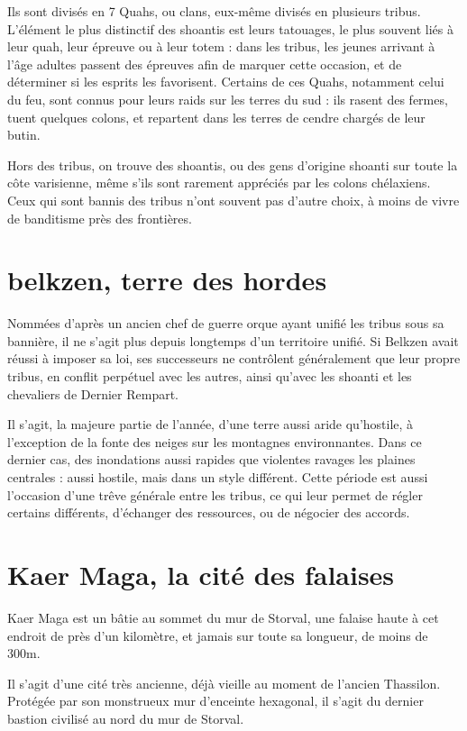 \documentclass[letterpaper,10pt,twoside,twocolumn,openany]{book}
\begin{document}
Ils sont divisés en 7 Quahs, ou clans, eux-même divisés en plusieurs tribus. L'élément le plus distinctif des shoantis est leurs tatouages, le plus souvent liés à leur quah, leur épreuve ou à leur totem : dans les tribus, les jeunes arrivant à l'âge adultes passent des épreuves afin de marquer cette occasion, et de déterminer si les esprits les favorisent. Certains de ces Quahs, notamment celui du feu, sont connus pour leurs raids sur les terres du sud : ils rasent des fermes, tuent quelques colons, et repartent dans les terres de cendre chargés de leur butin.

Hors des tribus, on trouve des shoantis, ou des gens d'origine shoanti sur toute la côte varisienne, même s'ils sont rarement appréciés par les colons chélaxiens. Ceux qui sont bannis des tribus n'ont souvent pas d'autre choix, à moins de vivre de banditisme près des frontières.
\section{belkzen, terre des hordes}
Nommées d'après un ancien chef de guerre orque ayant unifié les tribus sous sa bannière, il ne s'agit plus depuis longtemps d'un territoire unifié. Si Belkzen avait réussi à imposer sa loi, ses successeurs ne contrôlent généralement que leur propre tribus, en conflit perpétuel avec les autres, ainsi qu'avec les shoanti et les chevaliers de Dernier Rempart.

Il s'agit, la majeure partie de l'année, d'une terre aussi aride qu'hostile, à l'exception de la fonte des neiges sur les montagnes environnantes. Dans ce dernier cas, des inondations aussi rapides que violentes ravages les plaines centrales : aussi hostile, mais dans un style différent. Cette période est aussi l'occasion d'une trêve générale entre les tribus, ce qui leur permet de régler certains différents, d'échanger des ressources, ou de négocier des accords.


\section{Kaer Maga, la cité des falaises}
Kaer Maga est un bâtie au sommet du mur de Storval, une falaise haute à cet endroit de près d'un kilomètre, et jamais sur toute sa longueur, de moins de 300m. 

Il s'agit d'une cité très ancienne, déjà vieille au moment de l'ancien Thassilon. Protégée par son monstrueux mur d'enceinte hexagonal, il s'agit du dernier bastion civilisé au nord du mur de Storval.
\end{document}

